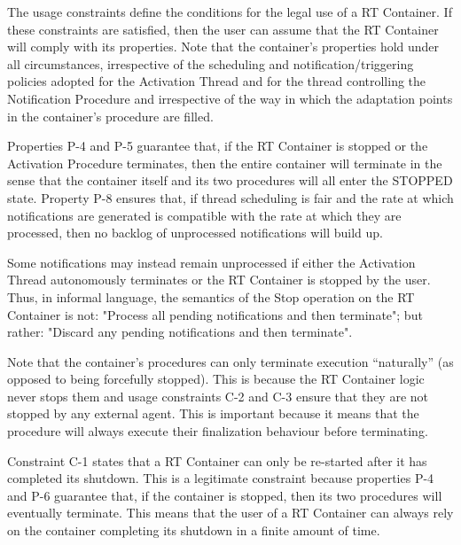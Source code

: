 The usage constraints define the conditions for the legal use of a RT Container. If these
constraints are satisfied, then the user can assume that the RT Container will comply with its
properties. Note that the container's properties hold under all circumstances, irrespective of the
scheduling and notification/triggering policies adopted for the Activation Thread and for the
thread controlling the Notification Procedure and irrespective of the way in which the
adaptation points in the container's procedure are filled.

Properties P-4 and P-5 guarantee that, if the RT Container is stopped or the Activation
Procedure terminates, then the entire container will terminate in the sense that the container
itself and its two procedures will all enter the STOPPED state. 
Property P-8 ensures that, if thread scheduling is fair and the rate at which notifications are generated is compatible with the rate at which they are processed, then no backlog of unprocessed notifications will build up. 

Some notifications may instead remain unprocessed if either the Activation Thread autonomously terminates or the RT Container is stopped by the user. Thus, in informal language, the semantics of the Stop operation on the RT Container is not: "Process all pending notifications and then terminate"; but rather: "Discard any pending notifications and then terminate". 

Note that the container's procedures can only terminate execution “naturally” (as opposed to
being forcefully stopped). This is because the RT Container logic never stops them and usage
constraints C-2 and C-3 ensure that they are not stopped by any external agent. This is
important because it means that the procedure will always execute their finalization behaviour
before terminating.

Constraint C-1 states that a RT Container can only be re-started after it has completed its
shutdown. This is a legitimate constraint because properties P-4 and P-6 guarantee that,
if the container is stopped, then its two procedures will eventually terminate. This means that
the user of a RT Container can always rely on the container completing its shutdown in a finite
amount of time.

